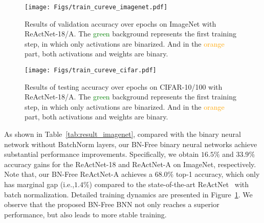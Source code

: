 \documentclass[final]{cvpr}
\begin{document}
\begin{figure}[htb]
    \centering
    \texttt{[image: Figs/train\_cureve\_imagenet.pdf]}
    \caption{Results of validation accuracy over epochs on ImageNet with ReActNet-18/A. The \textcolor{green}{green} background represents the first training step, in which only activations are binarized. And in the \textcolor{orange}{orange} part, both activations and weights are binary.}
    \label{fig:curve_imagenet}
\end{figure}

\begin{figure*}[!htb]
    \centering
    \texttt{[image: Figs/train\_cureve\_cifar.pdf]}
    \caption{Results of testing accuracy over epochs on CIFAR-10/100 with ReActNet-18/A. The \textcolor{green}{green} background represents the first training step, in which only activations are binarized. And in the \textcolor{orange}{orange} part, both activations and weights are binary.}
    \label{fig:curve_cifar}
\end{figure*}

As shown in Table~\ref{tab:result_imagenet}, compared with the binary neural network without BatchNorm layers, our BN-Free binary neural networks achieve substantial performance improvements. Specifically, we obtain $16.5\%$ and $33.9\%$ accuracy gains for the ReActNet-18 and ReActNet-A on ImageNet, respectively. Note that, our BN-Free ReActNet-A achieves a $68.0\%$ top-1 accuracy, which only has marginal gap (i.e.,$1.4\%$) compared to the state-of-the-art ReActNet~\cite{liu2020reactnet} with batch normalization. Detailed training dynamics are presented in Figure~\ref{fig:curve_imagenet}. We observe that the proposed BN-Free BNN not only reaches a superior performance, but also leads to more stable training. 
\end{document}
